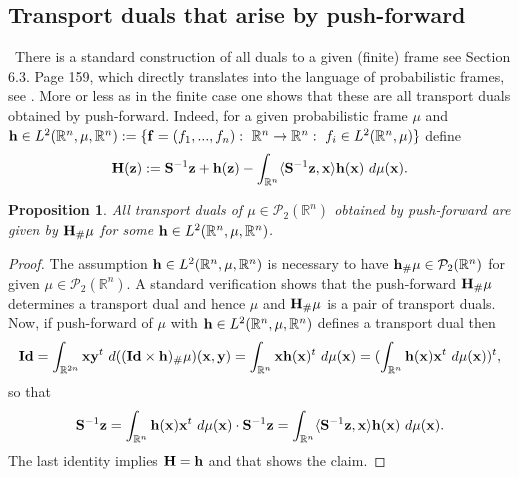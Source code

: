 \documentclass{amsart}
\numberwithin{equation}{section}
\newcommand\cP{{\mathcal P}}
\newcommand\bS{{\bf S}}
\newcommand\R{{\mathbb R}}
\newcommand\id{{\operatorname{\bf Id}}}
\theoremstyle{plain}
\newtheorem{proposition}[subsection]{Proposition}
\theoremstyle{definition}
\begin{document}
\subsection{Transport duals that arise by push-forward}\  
There is a standard construction of all duals to a given (finite) frame see \cite{christensen} Section 6.3. Page 159, which directly translates into the language
of probabilistic frames, see \cite{wickman2017duality}. More or less as in the finite case one shows that these are all transport duals obtained
by push-forward. Indeed, for a given probabilistic frame $\mu$ and ${\bf h} \in L^2(\R^n, \mu, \R^n):=\{{\bf f}=(f_1,...,f_n):\ \R^n \rightarrow \R^n:\ f_i \in L^2(\R^n, \mu)
\}$ define  
\begin{equation}\label{dual_push_forward} 
{\bf H}({\bf z}):= \bS^{-1}{\bf z} +{\bf h}({\bf z})-\int_{\R^n}\langle \bS^{-1}{\bf z},{\bf x} \rangle {\bf h}({\bf x})\ d\mu({\bf x}). 
\end{equation}
\begin{proposition}
All transport duals of $\mu \in \cP_2(\R^n)$ obtained by push-forward are given by ${\bf H}_{\#}\mu$ for some ${\bf h} \in L^2(\R^n, \mu, \R^n)$.   
\end{proposition}
\begin{proof}
The assumption ${\bf h} \in L^2(\R^n,\mu, \R^n)$ is necessary to have ${\bf h}_{\#}\mu\in \cP_2(\R^n)$ for given $\mu\in \cP_2(\R^n)$.
A standard verification shows that the push-forward ${\bf H}_{\#}\mu$ determines a transport dual and hence $\mu$ and ${\bf H}_{\#}\mu$ is a pair
of transport duals. Now, if push-forward of $\mu$ with  ${\bf h} \in L^2(\R^n,\mu, \R^n)$ defines a transport dual then  
\[\id = \int_{\R^{2n}} {\bf x}{\bf y}^t \ d ((\id \times {\bf h} )_{\#}\mu)({\bf x}, {\bf y}) =\int_{\R^n} {\bf x}{\bf h}({\bf x})^t \ d\mu({\bf x})=
(\int_{\R^n} {\bf h}({\bf x}) {\bf x}^t \ d\mu({\bf x}))^t, \] 
so that 
$$\bS^{-1}{\bf z} = \int_{\R^n} {\bf h}({\bf x}) {\bf x}^t \ d\mu({\bf x}) \cdot \bS^{-1}{\bf z}=\int_{\R^n}\langle \bS^{-1}{\bf z},{\bf x} \rangle {\bf h}({\bf x})\ d\mu({\bf x}).$$
The last identity implies ${\bf H} = {\bf h}$ and that shows the claim. 
  \end{proof}
 
\end{document}
